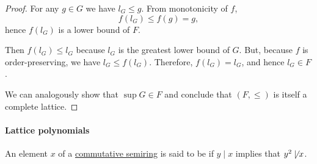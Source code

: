 \begin{proof}
  For any \( g \in G \) we have \( l_G \leq g \). From monotonicity of \( f \),
  \begin{equation*}
    f(l_G) \leq f(g) = g,
  \end{equation*}
  hence \( f(l_G) \) is a lower bound of \( F \).

  Then \( f(l_G) \leq l_G \) because \( l_G \) is the greatest lower bound of \( G \). But, because \( f \) is order-preserving, we have \( l_G \leq f(l_G) \). Therefore, \( f(l_G) = l_G \), and hence \( l_G \in F \).

  We can analogously show that \( \sup G \in F \) and conclude that \( (F, \leq) \) is itself a complete lattice.
\end{proof}

\paragraph{Lattice polynomials}

\begin{definition}\label{def:square_free}\mimprovised
  An element \( x \) of a \hyperref[def:semiring/commutative]{commutative semiring} is said to be  if \( y \mid x \) implies that \( y^2 \not\mid x \).
\end{definition}

